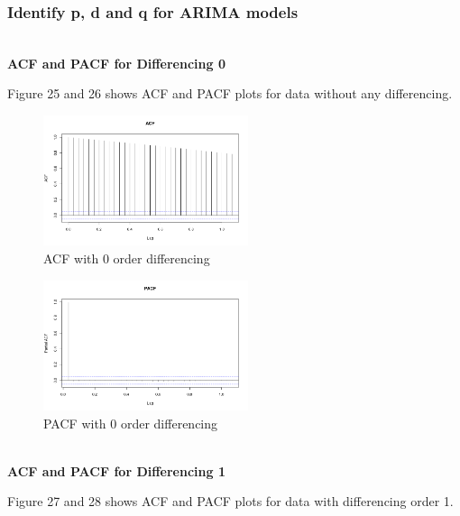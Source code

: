 \documentclass{article}
\begin{document}
\newpage
\subsubsection{Identify p, d and q for ARIMA models}

\\ \textbf{ACF and PACF for Differencing 0}

Figure 25 and 26 shows ACF and PACF plots for data without any differencing.

\begin{figure}[ht]
	\centering
	\includegraphics[width=6cm]{ACFWith0Differencing.png}
	\caption{ACF with 0 order differencing}
	\label{fig: ACF with 0 order differencing}
\end{figure}
\newpage
\begin{figure}[ht]
	\centering
	\includegraphics[width=6cm]{PACFWith0Differencing.png}
	\caption{PACF with 0 order differencing}
	\label{fig: PACF with 0 order differencing}
\end{figure}

\\ \textbf{ACF and PACF for Differencing 1}

Figure 27 and 28 shows ACF and PACF plots for data with differencing order 1.
\end{document}
